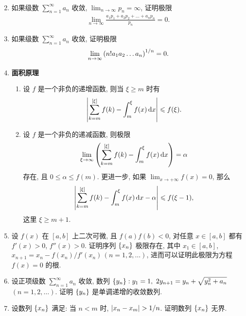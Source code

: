 \documentclass{ctexart}
\let\set\qty
\let\ge\geqslant
\let\le\leqslant
\newcommand{\limit}[2]{\lim_{#1 \to #2}}
\begin{document}
\begin{enumerate}[series=exer]
\begin{align*}
    \end{align*}
    \item 如果级数 $ \sum_{n = 1}^{\infty} a_{n} $ 收敛, $ \limit{n}{\infty} p_{n} = \infty $, 证明极限
    \begin{align*}
        \limit{n}{\infty}\frac{a_{1} p_{1} + a_{2} p_{2} + \dots + a_{n} p_{n}}{p_{n}} = 0.
    \end{align*}
    \item 如果级数 $ \sum_{n = 1}^{\infty} a_{n} $ 收敛, 证明极限
    \begin{align*}
        \limit{n}{\infty}\qty(n! a_{1} a_{2} \dots a_{n})^{1/n} = 0.
    \end{align*}
    \item \textbf{面积原理}
    \begin{enumerate}
        \item 设 $ f $ 是一个非负的递增函数, 则当 $ \xi \ge m $ 时有
        \begin{align*}
            \abs{\sum_{k = m}^{[\xi]} f(k) - \int_{m}^{\xi} f(x) \dd{x}} \le f(\xi).
        \end{align*}
        \item 设 $ f $ 是一个非负的递减函数, 则极限
        \begin{align*}
            \limit{\xi}{\infty} \qty(\sum_{k = m}^{[\xi]} f(k) - \int_{m}^{\xi} f(x) \dd{x}) = \alpha
        \end{align*}
        存在, 且 $ 0 \le \alpha \le f(m) $. 更进一步, 如果 $ \limit{x}{+\infty} f(x) = 0 $, 那么
        \begin{align*}
            \abs{\sum_{k = m}^{[\xi]} f(k) - \int_{m}^{\xi} f(x) \dd{x} - \alpha} \le f(\xi - 1),
        \end{align*} 
        这里 $ \xi \ge m + 1 $. 
    \end{enumerate}
    \item 设 $ f(x) $ 在 $ [a, b] $ 上二次可微, 且 $ f(a)f(b) < 0 $, 对任意 $ x \in [a, b] $ 都有 $ f'(x) > 0 $, $ f''(x) > 0 $. 证明序列 $ \set{x_{n}} $ 极限存在, 其中 $ x_{1} \in [a, b] $, $ x_{n + 1} = x_{n} - f(x_{n})/f'(x_{n})\,(n = 1, 2, \dots) $, 进而可以证明此极限为方程 $ f(x) = 0 $ 的根. 
    \item 设正项级数 $ \sum_{n = 1}^{\infty} a_{n} $ 收敛, 数列 $ \set{y_{n}} : y_{1} = 1,\ 2y_{n + 1} = y_{n} + \sqrt{y_{n}^{2} + a_{n}} $\, $ (n = 1, 2, \dots) $. 证明 $ \set{y_{n}} $ 是单调递增的收敛数列. 
    \item 设数列 $ \set{x_{n}} $ 满足: 当 $ n < m $ 时, $ \abs{x_{n} - x_{m}} > 1/n $. 证明数列 $ \set{x_{n}} $ 无界.

\end{enumerate}
\end{document}
